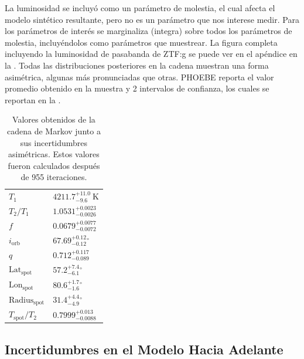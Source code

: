 La luminosidad se incluyó como un parámetro de molestia, el cual afecta el
modelo sintético resultante, pero no es un parámetro que nos interese medir.
Para los parámetros de interés se marginaliza (integra) sobre todos los
parámetros de molestia, incluyéndolos como parámetros que muestrear. La figura
completa incluyendo la luminosidad de pasabanda de ZTF:g se puede ver en el
apéndice en la . Todas las
distribuciones posteriores en la cadena muestran una forma asimétrica, algunas
más pronunciadas que otras. PHOEBE reporta el valor promedio obtenido en la
muestra y 2 intervalos de confianza, los cuales se reportan en la
.

{\renewcommand{\arraystretch}{1.5}%
\begin{table}[!ht]
	\centering
	\begin{tabular}{|P{3cm}|P{4cm}|}
		\hline
		                        &  \\
		\hline
		$T_{ 1 }$ & $4211.7^{ +11.0 }_{ -9.6 } ~\mathrm{K}$ \\
		\hline 
		$T_2 / T_1 $ & $1.0531^{ +0.0023 }_{ -0.0026 } \mathrm{}$ \\
		\hline 
		$f$ & $0.0679^{ +0.0077 }_{ -0.0072 } \mathrm{}$ \\
		\hline 
		$i_\mathrm{ orb }$ & $67.69^{ +0.12 }_{ -0.12 } \mathrm{{}^{\circ}}$ \\
		\hline 
		$q$ & $0.712^{ +0.117 }_{ -0.089 } \mathrm{}$ \\
		\hline 
		$\mathrm{ Lat }_{\mathrm{spot}}$ & $57.2^{ +7.4 }_{ -6.1 } \mathrm{{}^{\circ}}$ \\
		\hline 
		$\mathrm{ Lon }_{\mathrm{spot}}$ & $80.6^{ +1.7 }_{ -1.6 } \mathrm{{}^{\circ}}$ \\
		\hline 
		$\mathrm{ Radius }_{\mathrm{spot}}$ & $31.4^{ +4.4 }_{ -4.9 } \mathrm{{}^{\circ}}$ \\
		\hline 
		$T_{\mathrm{spot}} / T_2$ & $0.7999^{ +0.013 }_{ -0.0088 } \mathrm{}$ \\
		\hline 
	\end{tabular}
	\caption{Valores obtenidos de la cadena de Markov junto a sus incertidumbres
	asimétricas. Estos valores fueron calculados después de 955 iteraciones.}
	\label{tablaMcmcResultadosIncertidumbres}
\end{table}}

\subsection{Incertidumbres en el Modelo Hacia Adelante}

